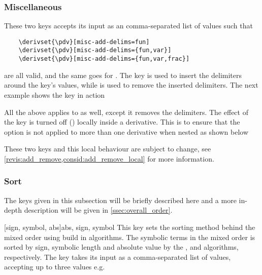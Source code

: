 \documentclass[final,british,10pt]{scrartcl}
\theoremstyle{remark}
\begin{document}
\subsubsection*{Miscellaneous}
These two keys accepts its input as an comma-separated list of values such that
\begin{verbatim}
	\derivset{\pdv}[misc-add-delims=fun]
	\derivset{\pdv}[misc-add-delims={fun,var}]
	\derivset{\pdv}[misc-add-delims={fun,var,frac}]
\end{verbatim}
are all valid, and the same goes for  . The key  is used to insert the delimiters around the key's values, while  is used to remove the inserted delimiters. The next example shows the key  in action


\noindent All the above applies to  as well, except it removes the delimiters. The effect of the key  is turned off () locally inside a derivative. This is to ensure that the option is not applied to more than one derivative when nested as shown below


\noindent These two keys and this local behaviour are subject to change, see \cref{revis:add_remove,consid:add_remove_local} for more information.

\subsubsection*{Sort}
The keys given in this subsection will be briefly described here and a more in-depth description will be given in \cref{ssec:overall_order}.

[sign, symbol, abs]{abs, sign, symbol}
This key sets the sorting method behind the mixed order using build in algorithms. The symbolic terms in the mixed order is sorted by sign, symbolic length and absolute value by the ,  and  algorithms, respectively. The key takes its input as a comma-separated list of values, accepting up to three values e.g.

\end{document}
